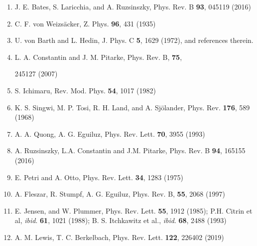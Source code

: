 \documentclass[12pt]{article}
\renewcommand{\_}{\kern-1.5pt\textunderscore\kern-1.5pt}
\begin{document}
\begin{enumerate}
\setlength{\parskip}{11.28pt}
	\item J. E. Bates, S. Laricchia, and A. Ruzsinszky, Phys. Rev. B \textbf{93}, 045119 (2016)\par

	\item C. F. von Weizsäcker, Z. Phys. \textbf{96}, 431 (1935)\par

\setlength{\parskip}{0.0pt}
	\item U. von Barth and L. Hedin, J. Phys. C \textbf{5}, 1629 (1972), and references therein.\par

	\item L. A. Constantin and J. M. Pitarke, Phys. Rev. B, \textbf{75},{\fontsize{9pt}{10.8pt}\selectfont  \par}245127 (2007)\par

	\item S. Ichimaru, Rev. Mod. Phys. \textbf{54}, 1017 (1982)\par

	\item K. S. Singwi, M. P. Tosi, R. H. Land, and A. Sjölander, Phys. Rev. \textbf{176}, 589 (1968)\par

	\item A. A. Quong, A. G. Eguiluz, Phys. Rev. Lett. \textbf{70}, 3955 (1993)\par

\setlength{\parskip}{11.28pt}
	\item A. Ruzsinszky, L.A. Constantin and J.M. Pitarke, Phys. Rev. B \textbf{94}, 165155 (2016)\par

\setlength{\parskip}{0.0pt}
	\item E. Petri and A. Otto, Phys. Rev. Lett. \textbf{34}, 1283 (1975)\par

	\item A. Fleszar, R. Stumpf, A. G. Eguiluz, Phys. Rev. B, \textbf{55}, 2068 (1997)\par

	\item E. Jensen, and W. Plummer, Phys. Rev. Lett. \textbf{55}, 1912 (1985); P.H. Citrin et al, \textit{ibid}. \textbf{61}, 1021 (1988); B. S. Itchkawitz et al., \textit{ibid}. \textbf{68}, 2488 (1993)\par

	\item A. M. Lewis, T. C. Berkelbach, Phys. Rev. Lett. \textbf{122}, \textcolor[HTML]{222222}{226402 (2019)}\par


\end{enumerate}
\end{document}
